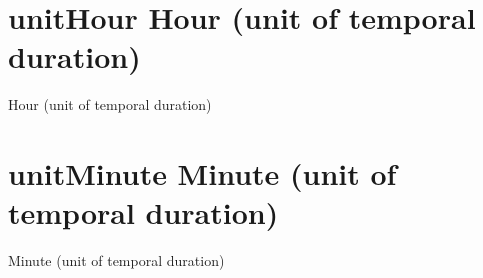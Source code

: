\documentclass[letterpaper,10pt,english]{sphinxmanual}
\begin{document}
\section{unitHour \sphinxhyphen{} Hour (unit of temporal duration)}
\label{\detokenize{doc-unitHour:unithour-hour-unit-of-temporal-duration}}\label{\detokenize{doc-unitHour:index-0}}\label{\detokenize{doc-unitHour::doc}}
\begin{sphinxShadowBox}

\sphinxAtStartPar
Hour (unit of temporal duration)
\end{sphinxShadowBox}
\begin{quote}
\label{\detokenize{doc-unitMinute:unitminute}}\label{\detokenize{doc-unitMinute:minute-unit-of-temporal-duration}}\label{\detokenize{doc-unitMinute:unitminute}}
\ignorespaces \end{quote}


\section{unitMinute \sphinxhyphen{} Minute (unit of temporal duration)}
\label{\detokenize{doc-unitMinute:unitminute-minute-unit-of-temporal-duration}}\label{\detokenize{doc-unitMinute:index-0}}\label{\detokenize{doc-unitMinute::doc}}
\begin{sphinxShadowBox}

\sphinxAtStartPar
Minute (unit of temporal duration)
\end{sphinxShadowBox}
\begin{quote}
\label{\detokenize{doc-unitMonth:unitmonth}}\label{\detokenize{doc-unitMonth:month-unit-of-temporal-duration}}\label{\detokenize{doc-unitMonth:unitmonth}}
\ignorespaces \end{quote}
\end{document}
